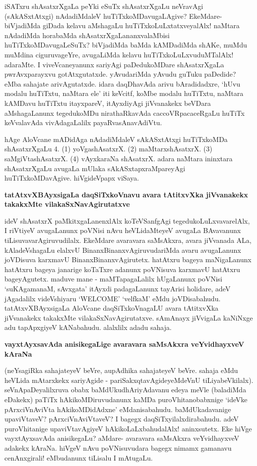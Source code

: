 \noindent
iSATxru shAsatxrXgaLa peYki eSuTx shAsatxrXgaLu neVravAgi (sAkASxtAtxgi) nAdadiMdaleV huTiTxkoMDavugaLA\-give? EkeMdare- biVjadiMda giDada kelavu aMshagaLu huTiTxkoLuLxtatxveyalAlx! naMtara nAdadiMda hora\-baMda shAsatxrXgaLananxvalaMbisi huTiTxkoMDavugaLeSuTx? biVjadiMda baMda kAMDadiMda shAKe, muMdu muM\-dina ciguruvageYre, avugaLiMda kelavu huTiTxkoLuLxvuduMTalAlx! adaraMte. I viveVcane\-yanunx sari\-yAgi paDedukoMDare shAsatxrXgaLa pwrAvxparayxvu gotAtxgutatxde. yAvudariMda yAvudu guTuku paDe\-dide? eMba sahajate arivAgutatxde. idara daqDhavAda arivu bAradidadxre, `hUvu modalu huTiTxtu, naMtara\- ele' iti keVcitf, koMbe modalu huTiTxtu, naMtara kAMDavu huTiTxtu itayxpareV, itAyxdi\-yAgi jiVvanakekx beVDara aMshagaLanunx tegedukoMDu nirathaRkavAda caccoVRpacaceRgaLu huTiTx keVvala\-vAda vivAdagaLalilx payaRvasAnavAdiVtu.

hAge AloVcane mADidAga nAdadiMdaleV sAkASxtAtxgi huTiTxkoMDa shAsatxrXgaLu 4. (1) yoVgashAsatxrX. (2) maMtarxshAsatxrX. (3) saMgiVtashAsatxrX. (4) vAyxkaraNa shAsatxrX. adara naMtara ininxtara shAsatxrXgaLu avugaLa mUlaka sAkASxtapxraMpareyAgi huTiTxkoMDavAgive. hiVgideVpapx viSaya.

{\bigskip
\noindent
{\large\bf tatAtxvXBAyxsigaLa daqSiTxkoVnavu avara tAtitxvXka jiVvanakekx takakxMte vilakaSxNavAgi\-rutatxve}}\label{page175}
\medskip

\noindent
ideV shAsatxrX paMkitxgaLanenxlAlx koTeVSanfgAgi tegedukoLuLxvavarelAlx, I riVtiyeV avugaLanunx poVNisi nAvu heVLidaMteyeV avugaLa BAvavanunx tiLisuvava\-rAgiruvudilalx. EkeMdare avaravara saMsAkxra, avara jiVvanada ALa, kAladeVshagaLu elalxvU BinanxBinanxvAgiruvudariMda avaru avugaLanunx joVDisuva karxmavU\- BinanxBinanxvAgirutetx. hatAtxru bageya maNigaLanunx hatAtxru bageya janarige koTaTxre adanunx poVNisuva karxmavU hatAtxru bageyAgutetx. maduve mane - maMTapagaLalilx hUgaLanunx poVNisi `suKAgamanaM, sAvx\-gata' itAyxdi padagaLanunx tayArisi holidare, adeV jAgadalilx videVshiyaru {\rm `WELCOME'} `velfkaM' eMdu joVDisabahudu. tatAtxvXBAyxsigaLa AloVcane daqSiTxkoVnagaLU avara tAtitxvXka jiVvanakekx takakxMte vilakaSxNavAgirutatxve. sAmAnayx jiVvigaLa kaNiNxge adu tapApxgiyeV kANabahudu. alalxlilx adadu sahaja.

{\bigskip
\noindent
{\large\bf vayxtAyxsavAda anisikegaLige avaravara saMsAkxra veYvidhayxveV kAraNa}}\label{page176}
\medskip

\noindent
(neYsagiRka sahajateyeV beVre, aupAdhika sahajateyeV beVre. sahaja eMdu \hbox{heVLida} mAtarxkekx sari\-yAgide - pariSakxqtavAgideyeMdeVnU tiLiyabeVkilalx). seVnApaDe\-yalilxruva obabx baMdUkudhAriyAda\-vanu edeya meVle (baladiMda eDakekx) paTiTx hAki\-koMDiruvudanunx kaMDa puroVhitanobabxnige `ideVke\- pArxciVnAviVta hAki\-koMDidAdxne' eMdanisabahudu. baMdUkadavanige upaviVtaveV? pArxciVnA\break\-viVtaveV? I bagegx daqSiTxyilalxdirabahudu. adeV puroVhitanige upaviVtavAgiyeV hAkikoLaLxbahudalAlx! aninx\-sutetx. Eke hiVge vayxtAyxsavAda anisikegaLu? aMdare- avaravara saMsAkxra veYvidhayxveV adakekx kAraNa. hiVgeV nAvu poVNisuvudara bagegx nimamx gamanavu cenAnxgirali! eMbudanunx tiLisalu I mAtugaLu.

